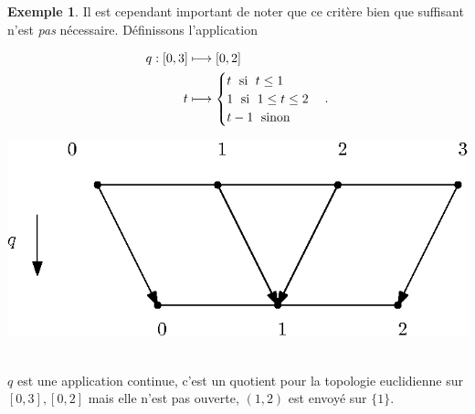 \documentclass[12pt]{book}
\theoremstyle{definition}
\newtheorem{example}[lemma]{Exemple}
\theoremstyle{remark}
\begin{document}
	\begin{example}
		Il est cependant important de noter que ce critère bien que suffisant n'est \emph{pas} nécessaire. Définissons l'application\\

		\noindent \begin{minipage}{0.5\textwidth}
		\begin{align*}
			q : [0,3] &\longmapsto [0,2]\\
			t &\longmapsto \begin{cases}
				t \text{\; si \;} t \le 1\\
				1 \text{\; si \;} 1 \le t \le 2\\
				t-1 \text{\; sinon}
			\end{cases}
		.\end{align*}
		\end{minipage}
		\hfill
		\noindent \begin{minipage}{0.5\textwidth}
			\includegraphics[width=\linewidth]{example_1.eps}
		\end{minipage}\\

		$q$ est une application continue, c'est un quotient pour la topologie euclidienne sur $[0,3], [0,2]$ mais elle n'est pas ouverte,  $(1,2)$ est envoyé sur $\{1\}$.
	\end{example}
\end{document}
